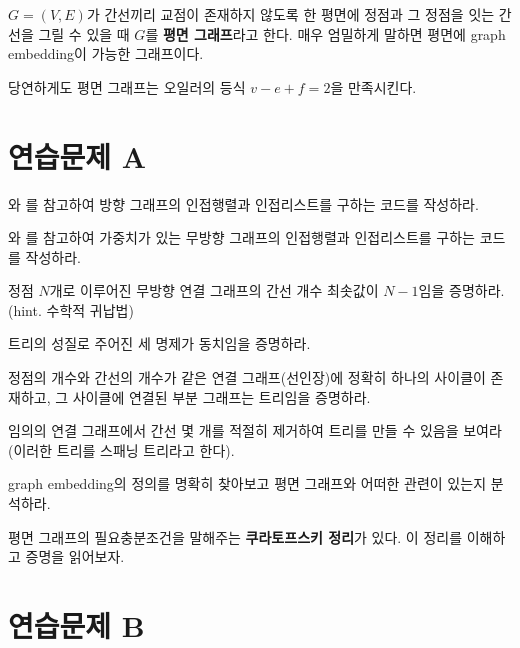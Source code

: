 \begin{definition}[평면 그래프]
    $G=(V, E)$가 간선끼리 교점이 존재하지 않도록 한 평면에 정점과 그 정점을 잇는 간선을 그릴 수 있을 때 $G$를 \textbf{평면 그래프}라고 한다. 매우 엄밀하게 말하면 평면에 graph embedding이 가능한 그래프이다.
\end{definition}

당연하게도 평면 그래프는 오일러의 등식 $v - e + f = 2$을 만족시킨다.

\section{연습문제 A}

\begin{problem}
    와 를 참고하여 방향 그래프의 인접행렬과 인접리스트를 구하는 코드를 작성하라.
\end{problem}
\begin{problem}
    와 를 참고하여 가중치가 있는 무방향 그래프의 인접행렬과 인접리스트를 구하는 코드를 작성하라.
\end{problem}
\begin{problem}
    정점 $N$개로 이루어진 무방향 연결 그래프의 간선 개수 최솟값이 $N-1$임을 증명하라. (hint. 수학적 귀납법)
\end{problem}
\begin{problem}
    트리의 성질로 주어진 세 명제가 동치임을 증명하라.
\end{problem}
\begin{problem}
    정점의 개수와 간선의 개수가 같은 연결 그래프(선인장)에 정확히 하나의 사이클이 존재하고, 그 사이클에 연결된 부분 그래프는 트리임을 증명하라.
\end{problem}
\begin{problem}
    임의의 연결 그래프에서 간선 몇 개를 적절히 제거하여 트리를 만들 수 있음을 보여라(이러한 트리를 스패닝 트리라고 한다).
\end{problem}
\begin{problem}
    graph embedding의 정의를 명확히 찾아보고 평면 그래프와 어떠한 관련이 있는지 분석하라.
\end{problem}
\begin{problem}
    평면 그래프의 필요충분조건을 말해주는 \textbf{쿠라토프스키 정리}가 있다. 이 정리를 이해하고 증명을 읽어보자.
\end{problem}

\section{연습문제 B}

